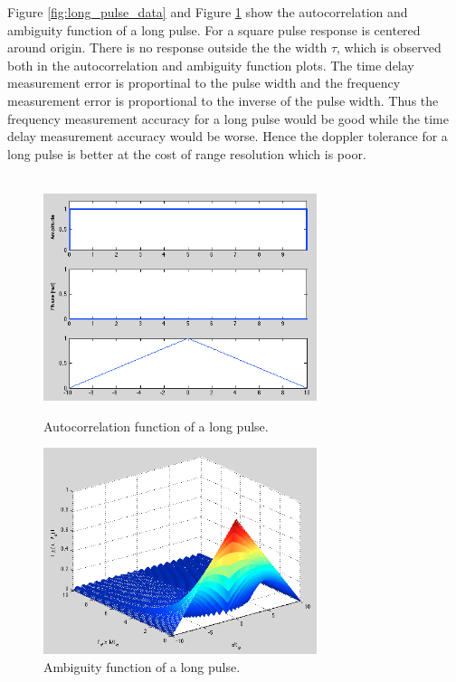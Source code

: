 \documentclass{article}
\begin{document}
Figure \ref{fig:long_pulse_data} and Figure \ref{fig:long_pulse_3d} show the autocorrelation and ambiguity function of a long pulse. For a square pulse response is centered around origin. There is no response outside the the width $\tau$, which is observed both in the autocorrelation and ambiguity function plots. The time delay measurement error is proportinal to the pulse width and the frequency measurement error is proportional to the inverse of the pulse width. Thus the frequency measurement accuracy for a long pulse would be good while the time delay measurement accuracy would be worse. Hence the doppler tolerance for a long pulse is better at the cost of range resolution which is poor. \cite{Skolnik:2001irs}\\
\\
\begin{figure}[h]
\begin{minipage}[t]{0.5\linewidth}
\centering
\includegraphics[width=8cm]{Figures/long_pulse_data.png}
\caption{Autocorrelation function of a long pulse.}
\label{fig:long_pulse_data}
\end{minipage}
\begin{minipage}[t]{0.5\linewidth}
\centering
\includegraphics[width=8cm]{Figures/long_pulse_3d.png}
\caption{Ambiguity function of a long pulse.}
\label{fig:long_pulse_3d}
\end{minipage}
\end{figure}
\end{document}
